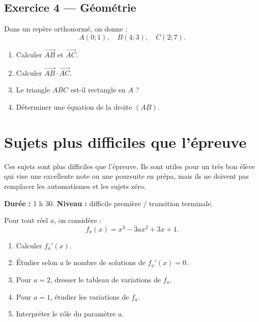 \documentclass[11pt,a4paper]{article}
\begin{document}
\begin{sujettype}
\subsection*{Exercice 4 — Géométrie}

Dans un repère orthonormé, on donne :
\[
A(0;1),\quad B(4;3),\quad C(2;7).
\]

\begin{enumerate}
  \item Calculer $\overrightarrow{AB}$ et $\overrightarrow{AC}$.
  \item Calculer $\overrightarrow{AB}\cdot\overrightarrow{AC}$.
  \item Le triangle $ABC$ est-il rectangle en $A$ ?
  \item Déterminer une équation de la droite $(AB)$.
\end{enumerate}
\end{sujettype}

\section{Sujets plus difficiles que l'épreuve}

\begin{alerte}[utilisation]
Ces sujets sont plus difficiles que l'épreuve. Ils sont utiles pour un très bon élève qui vise une excellente note ou une poursuite en prépa, mais ils ne doivent pas remplacer les automatismes et les sujets zéro.
\end{alerte}

\hypertarget{P-DIFF-01}{}
\begin{difficile}
\textbf{Durée :} 1 h 30.  
\textbf{Niveau :} difficile première / transition terminale.

Pour tout réel $a$, on considère :
\[
f_a(x)=x^3-3ax^2+3x+1.
\]

\begin{enumerate}
  \item Calculer $f_a'(x)$.
  \item Étudier selon $a$ le nombre de solutions de $f_a'(x)=0$.
  \item Pour $a=2$, dresser le tableau de variations de $f_a$.
  \item Pour $a=1$, étudier les variations de $f_a$.
  \item Interpréter le rôle du paramètre $a$.
\end{enumerate}
\end{difficile}
\end{document}
